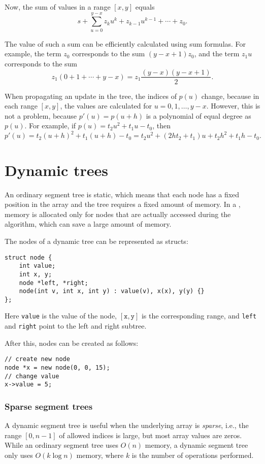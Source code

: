 Now, the sum of values in a range $[x,y]$ equals
\[s+\sum_{u=0}^{y-x} z_k u^k + z_{k-1} u^{k-1} + \cdots + z_0.\]

The value of such a sum
can be efficiently calculated using sum formulas.
For example, the term $z_0$ corresponds to the sum
$(y-x+1)z_0$, and the term $z_1 u$ corresponds to the sum
\[z_1(0+1+\cdots+y-x) = z_1 \frac{(y-x)(y-x+1)}{2} .\]

When propagating an update in the tree,
the indices of $p(u)$ change,
because in each range $[x,y]$,
the values are
calculated for $u=0,1,\ldots,y-x$.
However, this is not a problem, because
$p'(u)=p(u+h)$ is a polynomial
of equal degree as $p(u)$.
For example, if $p(u)=t_2 u^2+t_1 u-t_0$, then
\[p'(u)=t_2(u+h)^2+t_1(u+h)-t_0=t_2 u^2 + (2ht_2+t_1)u+t_2h^2+t_1h-t_0.\]

\section{Dynamic trees}


An ordinary segment tree is static,
which means that each node has a fixed position
in the array and the tree requires
a fixed amount of memory.
In a ,
memory is allocated only for nodes that
are actually accessed during the algorithm,
which can save a large amount of memory.

The nodes of a dynamic tree can be represented as structs:
\begin{lstlisting}
struct node {
    int value;
    int x, y;
    node *left, *right;
    node(int v, int x, int y) : value(v), x(x), y(y) {}
};
\end{lstlisting}
Here \texttt{value} is the value of the node,
$[\texttt{x},\texttt{y}]$ is the corresponding range,
and \texttt{left} and \texttt{right} point to the left
and right subtree.

After this, nodes can be created as follows:
\begin{lstlisting}
// create new node
node *x = new node(0, 0, 15);
// change value
x->value = 5;
\end{lstlisting}

\subsubsection{Sparse segment trees}


A dynamic segment tree is useful when
the underlying array is \emph{sparse},
i.e., the range $[0,n-1]$
of allowed indices is large,
but most array values are zeros.
While an ordinary segment tree uses $O(n)$ memory,
a dynamic segment tree only uses $O(k \log n)$ memory,
where $k$ is the number of operations performed.

